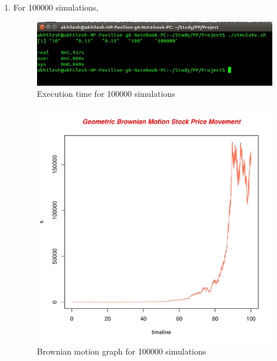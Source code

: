 \documentclass[10pt,a4paper]{article}
\begin{document}
\begin{enumerate}
\newpage
\item For 100000 simulations,\\
\begin{figure}[h]
\centering
\includegraphics[scale=0.5]{100000}
\caption{Execution time for 100000 simulations}
\end{figure}
\begin{figure}[h]
\centering
\includegraphics[scale=0.5]{100000_graph.pdf}
\caption{Brownian motion graph for 100000 simulations}
\end{figure}


\end{enumerate}
\end{document}
